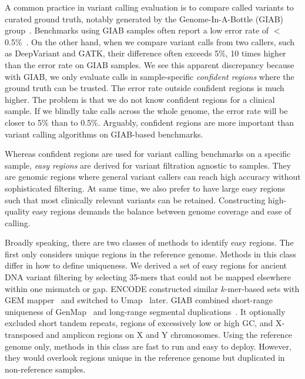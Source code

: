 \documentclass[webpdf,contemporary,large,namedate]{oup-authoring-template}%
\begin{document}
A common practice in variant calling evaluation is to compare called variants to curated ground truth,
notably generated by the Genome-In-A-Bottle (GIAB) group~\citep{Zook:2014ab}.
Benchmarks using GIAB samples often report a low error rate of $<$0.5\%~\citep{Olson:2022aa}.
On the other hand, when we compare variant calls from two callers, such as DeepVariant and GATK,
their difference often exceeds 5\%, 10 times higher than the error rate on GIAB samples.
We see this apparent discrepancy because with GIAB, we only evaluate calls in sample-specific \emph{confident regions}
where the ground truth can be trusted.
The error rate outside confident regions is much higher.
The problem is that we do not know confident regions for a clinical sample.
If we blindly take calls across the whole genome,
the error rate will be closer to 5\% than to 0.5\%.
Arguably, confident regions are more important than variant calling algorithms on GIAB-based benchmarks.

Whereas confident regions are used for variant calling benchmarks on a specific sample,
\emph{easy regions} are derived for variant filtration agnostic to samples.
They are genomic regions where general variant callers can reach high accuracy without sophisticated filtering.
At same time, we also prefer to have large easy regions such that most clinically relevant variants can be retained.
Constructing high-quality easy regions demands the balance between genome coverage and ease of calling.

Broadly speaking, there are two classes of methods to identify easy regions.
The first only considers unique regions in the reference genome.
Methods in this class differ in how to define uniqueness.
We derived a set of easy regions for ancient DNA variant filtering by selecting 35-mers that could not be mapped elsewhere within one mismatch or gap.
ENCODE constructed similar $k$-mer-based sets with GEM mapper~\citep{Marco-Sola:2012kx}
and switched to Umap~\citep{Karimzadeh:2018aa} later.
GIAB combined short-range uniqueness of GenMap~\citep{Pockrandt:2020aa}
and long-range segmental duplications~\citep{Dwarshuis:2024aa}.
It optionally excluded short tandem repeats, regions of excessively low or high GC, and X-transposed and amplicon regions on X and Y chromosomes.
Using the reference genome only, methods in this class are fast to run and easy to deploy.
However, they would overlook regions unique in the reference genome but duplicated in non-reference samples.
\end{document}
